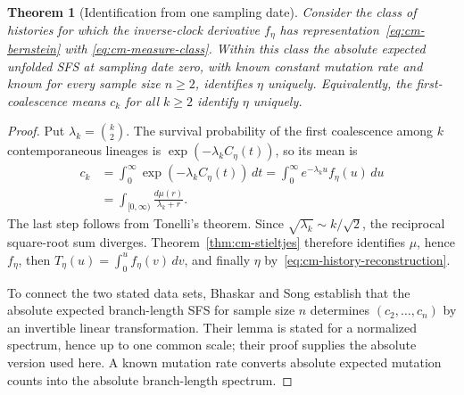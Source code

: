 \documentclass[11pt]{article}
\newtheorem{theorem}{Theorem}[section]
\theoremstyle{definition}
\theoremstyle{remark}
\numberwithin{equation}{section}
\begin{document}
\begin{theorem}[Identification from one sampling date]
\label{thm:cm-coalescent}
Consider the class of histories for which the inverse-clock derivative
$f_\eta$ has representation~\eqref{eq:cm-bernstein} with
\eqref{eq:cm-measure-class}.  Within this class the absolute expected
unfolded SFS at sampling date zero, with known constant mutation rate
and known for every sample size
$n\geq2$, identifies $\eta$ uniquely.  Equivalently, the first-coalescence
means $c_k$ for all $k\geq2$ identify $\eta$ uniquely.
\end{theorem}
\begin{proof}
Put $\lambda_k=\binom{k}{2}$.  The survival probability of the first
coalescence among $k$ contemporaneous lineages is
$\exp(-\lambda_k C_\eta(t))$, so its mean is
\begin{align*}
 c_k
 &=\int_0^\infty \exp(-\lambda_k C_\eta(t))\,dt
   =\int_0^\infty e^{-\lambda_k u} f_\eta(u)\,du\\
 &=\int_{[0,\infty)}\frac{d\mu(r)}{\lambda_k+r}.
\end{align*}
The last step follows from Tonelli's theorem.
Since $\sqrt{\lambda_k}\sim k/\sqrt2$, the reciprocal square-root
sum diverges.  Theorem~\ref{thm:cm-stieltjes} therefore identifies
$\mu$, hence $f_\eta$, then $T_\eta(u)=\int_0^u f_\eta(v)\,dv$,
and finally $\eta$ by~\eqref{eq:cm-history-reconstruction}.

To connect the two stated data sets, Bhaskar and Song
\cite[Lemma~1 and its proof]{BS} establish that the absolute
expected branch-length SFS for sample size $n$ determines
$(c_2,\ldots,c_n)$ by an invertible linear transformation.  Their
lemma is stated for a normalized spectrum, hence up to one common
scale; their proof supplies the absolute version used here.
A known mutation rate converts absolute expected mutation counts
into the absolute branch-length spectrum.
\end{proof}
\end{document}
